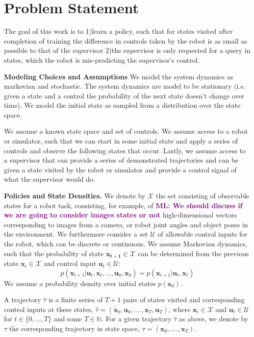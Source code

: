 \documentclass[10pt, conference]{ieeeconf}      %
\newcommand{\bu}{\mathbf{u}}
\newcommand{\bx}{\mathbf{x}}
\newcommand{\mlnote}[1]{\ifthenelse{\boolean{include-notes}}%
 {\textcolor{purple}{\textbf{ML: #1}}}{}}
\begin{document}
\section{Problem Statement}
The goal of this work is to 1)learn a policy, such that for states visited after completion of training the difference in controls taken by the robot is as small as possible to that of the supervisor 2)the supervisor is only requested for a query in states, which the robot is mis-predicting the supervisor's control. 

\noindent\textbf{Modeling Choices and Assumptions} We model the system dynamics as markovian and stochastic. The system dynamics are model to be stationary (i.e. given a state and a control the probability of the next state doesn't change over time). We model the initial state as sampled from a distribution over the state space.

We assume a known state space and set of controls. We assume access to a robot or simulator, such that we can start in some initial state and apply a series of controls and observe the following states that occur.  Lastly, we assume access to a supervisor that can provide a series of demonstrated trajectories and can be given a state visited by the robot or simulator and provide a control signal of what the supervisor would do. 

\noindent\textbf{Policies and State Densities.}
We denote by $\mathcal{X}$ the set consisting of observable states for a robot task, consisting, for example, of \mlnote{We should discuss if we are going to consider images states or not}
high-dimensional vectors corresponding to images from a camera, or robot joint angles and object poses in the environment.
We furthermore consider a set $\mathcal{U}$ of allowable control inputs for the robot, which can be discrete or
continuous. We assume Markovian dynamics, such that the probability of state $\mathbf{x_{t+1}}\in
\mathcal{X}$ can be determined from the previous state $\mathbf{x}_t\in\mathcal{X}$ and control input $\mathbf{u}_t\in
\mathcal{U}$: 
$$p(\bx_{t+1}|\bu_{t},\bx_{t}, \ldots, \bu_{0}, \bx_{0})=p(\bx_{t+1}|\bu_{t}, \bx_t)$$
We assume a probability density over initial states $p(\bx_0)$.

A trajectory $\hat{\tau}$ is a finite series of $T+1$ pairs of states visited and corresponding
control inputs at these states, $\hat{\tau} = (\mathbf{x}_0,\mathbf{u}_0, ...., \mathbf{x}_T,\mathbf{u}_T)$, where $\bx_t\in \mathcal{X}$
and $\bu_t\in \mathcal{U}$ for $t\in \{0, \ldots, T\}$ and some $T\in \mathbb{N}$.  
For a given trajectory $\hat{\tau}$ as above, we denote by ${\tau}$ the corresponding trajectory in state space,
${\tau} = (\bx_0,....,\bx_T)$.
\end{document}
